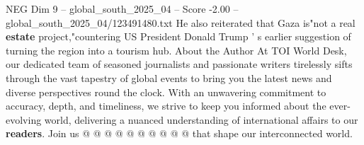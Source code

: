\begin{textsample}{NEG Dim 9 – global\_south\_2025\_04 – Score -2.00 – global\_south\_2025\_04/123491480.txt}
He also reiterated that Gaza is"not a real \textbf{estate} project,"countering US President Donald Trump ' s earlier suggestion of turning the region into a tourism hub.
About the Author At TOI World Desk, our dedicated team of seasoned journalists and passionate writers tirelessly sifts through the vast tapestry of global events to bring you the latest news and diverse perspectives round the clock.
With an unwavering commitment to accuracy, depth, and timeliness, we strive to keep you informed about the ever-evolving world, delivering a nuanced understanding of international affairs to our \textbf{readers}.
Join us @ @ @ @ @ @ @ @ @ @ that shape our interconnected world.

\end{textsample}
